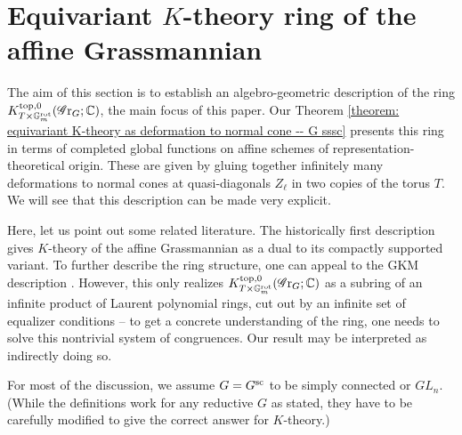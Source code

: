 \section{Equivariant \texorpdfstring{$K$}{K}-theory ring of the affine Grassmannian}\label{section: equivariant K-theory ring of the affine grassmannian}

The aim of this section is to establish an algebro-geometric description of the ring $K^{\top, 0}_{T \times \Gm^{\rot}}(\Gr_{G}; \C)$, the main focus of this paper. Our Theorem \ref{theorem: equivariant K-theory as deformation to normal cone -- G sssc} presents this ring in terms of completed global functions on affine schemes of representation-theoretical origin. These are given by gluing together infinitely many deformations to normal cones at quasi-diagonals $Z_{\ell}$ in two copies of the torus $T$. We will see that this description can be made very explicit.


Here, let us point out some related literature. The historically first description \cite{KK90} gives $K$-theory of the affine Grassmannian as a dual to its compactly supported variant. To further describe the ring structure, one can appeal to the GKM description \cite{HHH05}. However, this only realizes $K^{\top, 0}_{T \times \Gm^{\rot}}(\Gr_G; \C)$ as a subring of an infinite product of Laurent polynomial rings, cut out by an infinite set of equalizer conditions -- to get a concrete understanding of the ring, one needs to solve this nontrivial system of congruences. Our result may be interpreted as indirectly doing so.


For most of the discussion, we assume $G=G^{\sc}$ to be simply connected or $GL_n$. (While the definitions work for any reductive $G$ as stated, they have to be carefully modified to give the correct answer for $K$-theory.)

